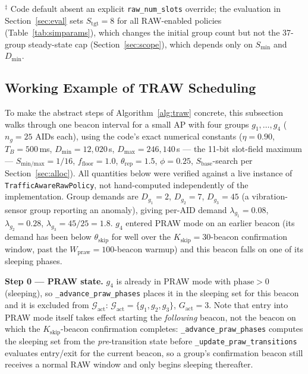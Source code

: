 \documentclass[journal]{IEEEtran}
\begin{document}
\begin{table}[!t]
\smallskip
\footnotesize $^\ddagger$ Code default absent an explicit
\texttt{raw\_num\_slots} override; the evaluation in
Section~\ref{sec:eval} sets $S_\mathrm{tgt}\!=\!8$ for all RAW-enabled
policies (Table~\ref{tab:simparams}), which changes the initial
group count but not the 37-group steady-state cap
(Section~\ref{sec:scope}), which depends only on $S_\mathrm{min}$ and
$D_\mathrm{min}$.
\end{table}

\subsection{Working Example of TRAW Scheduling}
\label{sec:example}

To make the abstract steps of Algorithm~\ref{alg:traw} concrete, this
subsection walks through one beacon interval for a small AP with four
groups $g_1,\ldots,g_4$ ($n_{g}\!=\!25$ AIDs each), using the code's
exact numerical constants
($\eta\!=\!0.90$, $T_B\!=\!500$\,ms, $D_\mathrm{min}\!=\!12{,}020$\,\textmu{}s,
$D_\mathrm{max}\!=\!246{,}140$\,\textmu{}s --- the 11-bit slot-field
maximum --- $S_\mathrm{min/max}\!=\!1/16$,
$f_\mathrm{floor}\!=\!1.0$, $\theta_\mathrm{rep}\!=\!1.5$,
$\phi\!=\!0.25$, $S_\mathrm{base}$-search per Section~\ref{sec:alloc}).
All quantities below were verified against a live instance of
\texttt{TrafficAwareRawPolicy}, not hand-computed independently of the
implementation.
Group demands are $D_{g_1}\!=\!2$, $D_{g_2}\!=\!7$, $D_{g_3}\!=\!45$
(a vibration-sensor group reporting an anomaly), giving per-AID demand
$\lambda_{g_1}\!=\!0.08$, $\lambda_{g_2}\!=\!0.28$,
$\lambda_{g_3}\!=\!45/25\!=\!1.8$.
$g_4$ entered PRAW mode on an earlier beacon (its demand has been below
$\theta_\mathrm{skip}$ for well over the $K_\mathrm{skip}\!=\!30$-beacon
confirmation window, past the $W_\mathrm{praw}\!=\!100$-beacon warmup)
and this beacon falls on one of its sleeping phases.

\textbf{Step 0 --- PRAW state.}
$g_4$ is already in PRAW mode with $\mathrm{phase}\!>\!0$
(sleeping), so \texttt{\_advance\_praw\_phases} places it in the
sleeping set for this beacon and it is excluded from
$\mathcal{G}_\mathrm{act}$: $\mathcal{G}_\mathrm{act}\!=\!\{g_1,g_2,g_3\}$,
$G_\mathrm{act}\!=\!3$.
Note that entry into PRAW mode itself takes effect starting the
\emph{following} beacon, not the beacon on which the
$K_\mathrm{skip}$-beacon confirmation completes: \texttt{\_advance\_praw\_phases}
computes the sleeping set from the \emph{pre}-transition state before
\texttt{\_update\_praw\_transitions} evaluates entry/exit for the
current beacon, so a group's confirmation beacon still receives a
normal RAW window and only begins sleeping thereafter.
\end{document}
